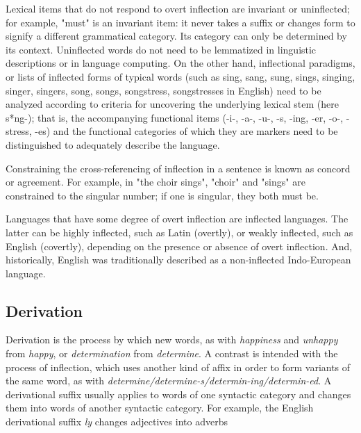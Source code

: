 Lexical items that do not respond to overt inflection are invariant or uninflected; for example, "must" is an invariant item: it never takes a suffix or changes form to signify a different grammatical category. Its category can only be determined by its context. Uninflected words do not need to be lemmatized in linguistic descriptions or in language computing. On the other hand, inflectional paradigms, or lists of inflected forms of typical words (such as sing, sang, sung, sings, singing, singer, singers, song, songs, songstress, songstresses in English) need to be analyzed according to criteria for uncovering the underlying lexical stem (here s*ng-); that is, the accompanying functional items (-i-, -a-, -u-, -s, -ing, -er, -o-, -stress, -es) and the functional categories of which they are markers need to be distinguished to adequately describe the language.

Constraining the cross-referencing of inflection in a sentence is known as concord or agreement. For example, in "the choir sings", "choir" and "sings" are constrained to the singular number; if one is singular, they both must be.

Languages that have some degree of overt inflection are inflected languages. The latter can be highly inflected, such as Latin (overtly), or weakly inflected, such as English (covertly), depending on the presence or absence of overt inflection. And, historically, English was traditionally described as a non-inflected Indo-European language.

\subsection{Derivation}
Derivation is  the process by which new words, as with \emph{happiness} and \emph{unhappy} from \emph{happy}, or \emph{determination} from \emph{determine}. A contrast is intended with the process of inflection, which uses another kind of affix in order to form variants of the same word, as with \emph{determine/determine-s/determin-ing/determin-ed}.  A derivational suffix usually applies to words of one syntactic category and changes them into words of another syntactic category. For example, the English derivational suffix \emph{ly} changes adjectives into adverbs

